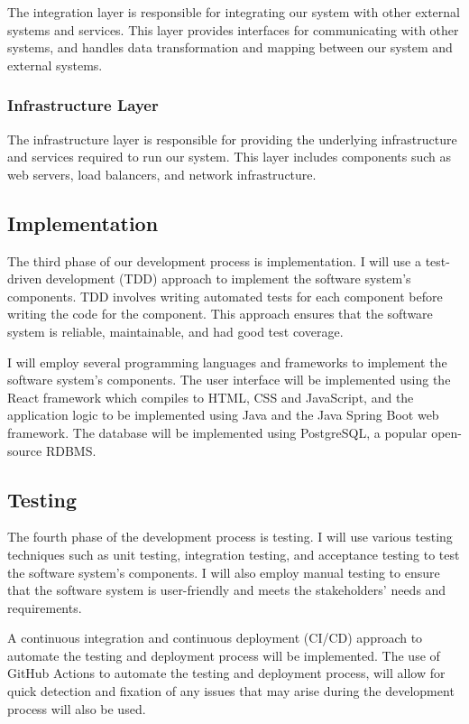 \documentclass{article}
\begin{document}
The integration layer is responsible for integrating our system with other external systems and services. This layer provides interfaces for communicating with other systems, and handles data transformation and mapping between our system and external systems.

\subsubsection{Infrastructure Layer}

The infrastructure layer is responsible for providing the underlying infrastructure and services required to run our system. This layer includes components such as web servers, load balancers, and network infrastructure.


\subsection{Implementation}

The third phase of our development process is implementation. I will use a test-driven development (TDD) approach to implement the software system's components. TDD involves writing automated tests for each component before writing the code for the component. This approach ensures that the software system is reliable, maintainable, and had good test coverage.

I will employ several programming languages and frameworks to implement the software system's components. The user interface will be implemented using the React framework which compiles to HTML, CSS and JavaScript, and the application logic to be implemented using Java and the Java Spring Boot web framework. The database will be implemented using PostgreSQL, a popular open-source RDBMS.

\subsection{Testing}

The fourth phase of the development process is testing. I will use various testing techniques such as unit testing, integration testing, and acceptance testing to test the software system's components. I will also employ manual testing to ensure that the software system is user-friendly and meets the stakeholders' needs and requirements.

A continuous integration and continuous deployment (CI/CD) approach to automate the testing and deployment process  will be implemented. The use of GitHub Actions to automate the testing and deployment process, will allow for quick detection and fixation of any issues that may arise during the development process will also be used.
\end{document}
